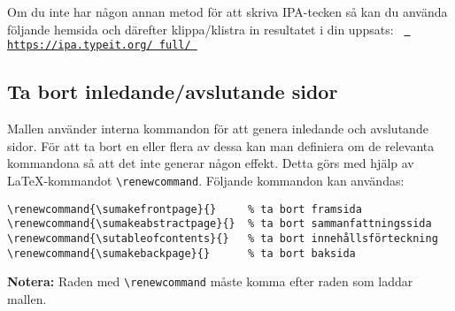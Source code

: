 Om du inte har någon annan metod för att skriva IPA-tecken så kan du använda
följande hemsida och därefter klippa/klistra in resultatet i din uppsats:
\texttt{%
  \href{https://ipa.typeit.org/full/}{%
    https://\linebreak[0]ipa\linebreak[0].typeit\linebreak[0].org/%
    \linebreak[0]full/%
}}


\subsection{Ta bort inledande/avslutande sidor}
\label{genererade}

Mallen använder interna kommandon för att genera inledande och avslutande
sidor. För att ta bort en eller flera av dessa kan man definiera om de
relevanta kommandona så att det inte generar någon effekt. Detta görs med hjälp
av \LaTeX-kommandot \verb|\renewcommand|. Följande kommandon kan användas:

\begin{verbatim}
\renewcommand{\sumakefrontpage}{}     % ta bort framsida
\renewcommand{\sumakeabstractpage}{}  % ta bort sammanfattningssida
\renewcommand{\sutableofcontents}{}   % ta bort innehållsförteckning
\renewcommand{\sumakebackpage}{}      % ta bort baksida
\end{verbatim}

\noindent\textbf{Notera:} Raden med \verb|\renewcommand| måste komma efter
raden som laddar mallen.

